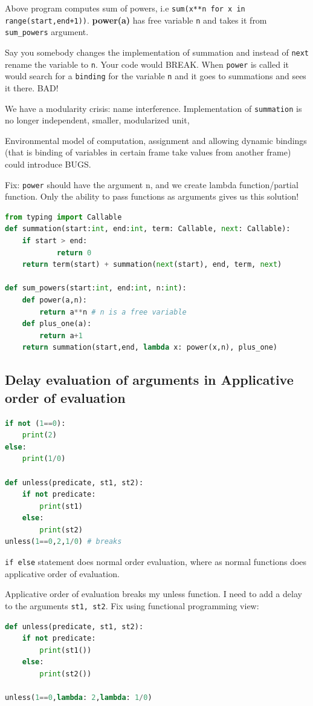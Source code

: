 \documentclass[a4paper,twoside]{article}
\numberwithin{equation}{section}
\begin{document}
Above program computes sum of powers, i.e \texttt{sum(x**n for x in range(start,end+1))}.
\textbf{power(a)} has free variable \texttt{n} and takes it from \texttt{sum\_powers} argument.

Say you somebody changes the implementation of summation and instead of \texttt{next} rename the variable
to \texttt{n}. Your code would BREAK. When \texttt{power} is called it would search for a \texttt{binding}
for the variable \texttt{n} and it goes to summations and sees it there. BAD!

We have a modularity crisis: name interference.
Implementation of \texttt{summation} is no longer independent, smaller, modularized unit,

Environmental model of computation, assignment and allowing dynamic bindings (that is binding of variables
in certain frame take values from another frame) could introduce BUGS.

Fix:
\texttt{power} should have the argument n, and we create lambda function/partial function.
Only the ability to pass functions as arguments gives us this solution!
\begin{lstlisting}[language = Python]
from typing import Callable
def summation(start:int, end:int, term: Callable, next: Callable):
    if start > end:
            return 0
    return term(start) + summation(next(start), end, term, next)

def sum_powers(start:int, end:int, n:int):
    def power(a,n):
        return a**n # n is a free variable
    def plus_one(a):
        return a+1
    return summation(start,end, lambda x: power(x,n), plus_one)
\end{lstlisting}

\subsection{Delay evaluation of arguments in Applicative order of evaluation}
\begin{lstlisting}[language = Python]
if not (1==0):
    print(2)
else:
    print(1/0)

def unless(predicate, st1, st2):
    if not predicate:
        print(st1)
    else:
        print(st2)
unless(1==0,2,1/0) # breaks
\end{lstlisting}
\texttt{if else} statement does normal order evaluation, where as normal functions does applicative order
of evaluation.

Applicative order of evaluation breaks my unless function.
I need to add a delay to the arguments \texttt{st1, st2}.
Fix using functional programming view:
\begin{lstlisting}[language = Python]
def unless(predicate, st1, st2):
    if not predicate:
        print(st1())
    else:
        print(st2())

unless(1==0,lambda: 2,lambda: 1/0)
\end{lstlisting}
\end{document}
